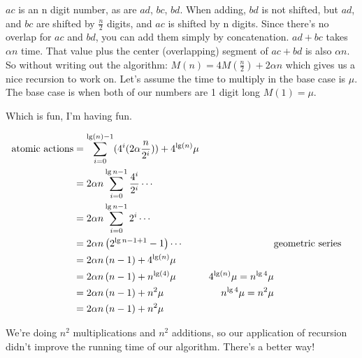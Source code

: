 \documentclass[english, 10pt]{article}
\begin{document}
$ac$ is an n digit number, as are $ad$, $bc$, $bd$. When adding, $bd$ is not shifted, but $ad$, and $bc$ are shifted by $\frac{n}{2}$ digits, and $ac$ is shifted by n digits.
Since there's no overlap for $ac$ and $bd$, you can add them simply by concatenation.
$ad + bc$ takes $\alpha n$ time. That value plus the center (overlapping) segment of $ac+bd$ is also $\alpha n$.
\newline
\newline
So without writing out the algorithm: $M(n) = 4M\left( \frac{n}{2} \right)+2\alpha n$ which gives us a nice recursion to work on. Let's assume the time to multiply in the base case is $\mu$. The base case is when both of our numbers are 1 digit long $M(1) = \mu$.


Which is fun, I'm having fun. 

\begin{align*}
    \text{atomic actions} &= \sum_{i=0}^{\lg(n)-1} (4^i (2\alpha\frac{n}{2^i}) ) + 4^{\lg(n)}\mu \\
    &=2\alpha n \sum_{i=0}^{\lg n-1}\frac{4^i}{2^i} \cdots\\
    &=2\alpha n \sum_{i=0}^{\lg n-1}{2^i} \cdots\\
    &=2\alpha n \left( 2^{\lg n -1 +1} -1 \right) \cdots& & \text{geometric series} \\
    &=2\alpha n \left( n-1 \right) + 4^{\lg(n)}\mu\\
    &=2\alpha n \left( n-1 \right) + n^{\lg(4)}\mu & 4^{\lg(n)} \mu = n^{\lg 4} \mu \\
    &=2\alpha n \left( n-1 \right) + n^{2}\mu & n^{\lg 4} \mu = n^2 \mu \\
    &=2\alpha n \left( n-1 \right)+n^2 \mu
\end{align*}

We're doing $n^2$ multiplications and $n^2$ additions, so our application of
recursion didn't improve the running time of our algorithm. There's a better
way!
\end{document}
